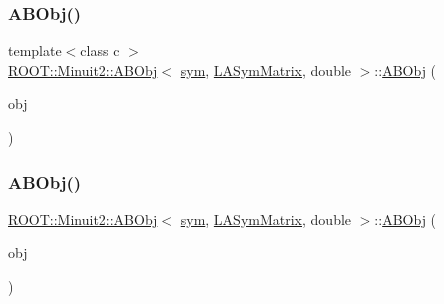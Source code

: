 \mbox{\label{classROOT_1_1Minuit2_1_1ABObj_3_01sym_00_01LASymMatrix_00_01double_01_4_a2632d99f281d85d56d8cd843e58eeac8}} 
\subsubsection{\texorpdfstring{ABObj()}{ABObj()}\hspace{0.1cm}{\footnotesize\ttfamily [8/12]}}
{\footnotesize\ttfamily template$<$class c $>$ \\
\mbox{\hyperlink{classROOT_1_1Minuit2_1_1ABObj}{R\+O\+O\+T\+::\+Minuit2\+::\+A\+B\+Obj}}$<$ \mbox{\hyperlink{classROOT_1_1Minuit2_1_1sym}{sym}}, \mbox{\hyperlink{classROOT_1_1Minuit2_1_1LASymMatrix}{L\+A\+Sym\+Matrix}}, double $>$\+::\mbox{\hyperlink{classROOT_1_1Minuit2_1_1ABObj}{A\+B\+Obj}} (\begin{DoxyParamCaption}\item[{const \mbox{\hyperlink{classROOT_1_1Minuit2_1_1ABObj}{A\+B\+Obj}}$<$ \mbox{\hyperlink{classROOT_1_1Minuit2_1_1vec}{vec}}, \mbox{\hyperlink{classROOT_1_1Minuit2_1_1LASymMatrix}{L\+A\+Sym\+Matrix}}, c $>$ \&}]{obj }\end{DoxyParamCaption})\hspace{0.3cm}{\ttfamily [inline]}}

\mbox{\label{classROOT_1_1Minuit2_1_1ABObj_3_01sym_00_01LASymMatrix_00_01double_01_4_a22738586c6027ada2234556dbab7d406}} 
\subsubsection{\texorpdfstring{ABObj()}{ABObj()}\hspace{0.1cm}{\footnotesize\ttfamily [9/12]}}
{\footnotesize\ttfamily \mbox{\hyperlink{classROOT_1_1Minuit2_1_1ABObj}{R\+O\+O\+T\+::\+Minuit2\+::\+A\+B\+Obj}}$<$ \mbox{\hyperlink{classROOT_1_1Minuit2_1_1sym}{sym}}, \mbox{\hyperlink{classROOT_1_1Minuit2_1_1LASymMatrix}{L\+A\+Sym\+Matrix}}, double $>$\+::\mbox{\hyperlink{classROOT_1_1Minuit2_1_1ABObj}{A\+B\+Obj}} (\begin{DoxyParamCaption}\item[{const \mbox{\hyperlink{classROOT_1_1Minuit2_1_1LASymMatrix}{L\+A\+Sym\+Matrix}} \&}]{obj }\end{DoxyParamCaption})\hspace{0.3cm}{\ttfamily [inline]}}

